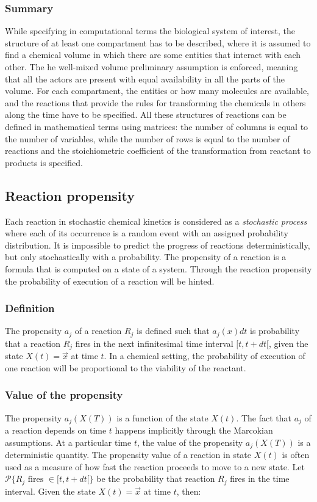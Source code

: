     \subsubsection{Summary}
    While specifying in computational terms the biological system of interest, the structure of at least one compartment has to be described, where it is assumed to find a chemical volume in which there are some entities that interact with each other.
    The he well-mixed volume preliminary assumption is enforced, meaning that all the actors are present with equal availability in all the parts of the volume.
    For each compartment, the entities or how many molecules are available, and the reactions that provide the rules for transforming the chemicals in others along the time have to be specified.
    All these structures of reactions can be defined in mathematical terms using matrices: the number of columns is equal to the number of variables, while the number of rows is equal to the number of reactions and the stoichiometric coefficient of the transformation from reactant to products is specified.

  \subsection{Reaction propensity}
  Each reaction in stochastic chemical kinetics is considered as a \emph{stochastic process} where each of its occurrence is a random event with an assigned probability distribution.
  It is impossible to predict the progress of reactions deterministically, but only stochastically with a probability.
  The propensity of a reaction is a formula that is computed on a state of a system.
  Through the reaction propensity the probability of execution of a reaction will be hinted.

    \subsubsection{Definition}
    The propensity $a_j$ of a reaction $R_j$ is defined such that $a_j(x)dt$ is probability that a reaction $R_j$ fires in the next infinitesimal time interval $[t, t+dt[$, given the state $X(t) = \vec{x}$ at time $t$.
  In a chemical setting, the probability of execution of one reaction will be proportional to the viability of the reactant.

    \subsubsection{Value of the propensity}
    The propensity $a_j(X(T))$ is a function of the state $X(t)$.
    The fact that $a_j$ of a reaction depends on time $t$ happens implicitly through the Marcokian assumptions.
    At a particular time $t$, the value of the propensity $a_j(X(T))$ is a deterministic quantity.
    The propensity value of a reaction in state $X(t)$ is often used as a measure of how fast the reaction proceeds to move to a new state.
    Let $\mathcal{P}\{R_j\text{ fires }\in [t,t+dt[\}$ be the probability that reaction $R_j$ fires in the time interval.
    Given the state $X(t)=\vec{x}$ at time $t$, then:

